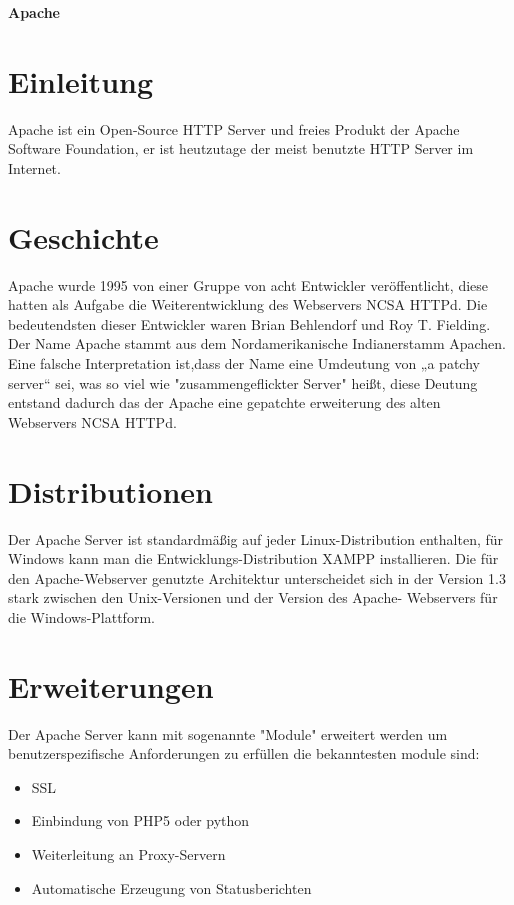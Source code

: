 \documentclass[a4paper, 11pt]{article}
\begin{document}
 
\thispagestyle{empty}
 

\begin{center}
\textbf{\LARGE{Apache}}
\end{center}


\section{Einleitung}
Apache ist ein Open-Source HTTP Server und freies Produkt der Apache Software Foundation, er ist heutzutage der meist benutzte HTTP Server  im Internet.

\section{Geschichte}
Apache wurde 1995 von einer Gruppe von acht Entwickler veröffentlicht, diese hatten als Aufgabe die Weiterentwicklung des  Webservers NCSA HTTPd. Die bedeutendsten dieser Entwickler waren Brian Behlendorf und Roy T. Fielding.
Der Name Apache stammt aus dem Nordamerikanische Indianerstamm Apachen. Eine falsche Interpretation ist,dass der Name eine Umdeutung von „a patchy server“ sei, was so viel wie "zusammengeflickter Server" heißt, diese Deutung entstand dadurch das der Apache eine gepatchte erweiterung des alten Webservers NCSA HTTPd.

\section{Distributionen}
Der Apache Server ist standardmäßig auf jeder Linux-Distribution enthalten, für Windows kann man die Entwicklungs-Distribution XAMPP installieren. Die für den Apache-Webserver genutzte Architektur unterscheidet sich in der 
Version 1.3 stark zwischen den Unix-Versionen und der Version des Apache-
Webservers für die Windows-Plattform.

\section{Erweiterungen}
Der Apache Server kann mit sogenannte "Module" erweitert werden um benutzerspezifische
Anforderungen zu erfüllen die bekanntesten module sind: 
\begin{itemize}
\item{SSL}
\item{Einbindung von PHP5 oder python}
\item{Weiterleitung an Proxy-Servern}
\item{Automatische Erzeugung von Statusberichten}
\end{itemize}
\end{document}
